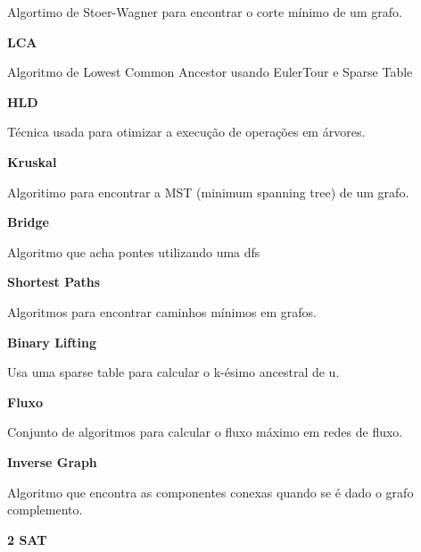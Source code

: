 \documentclass[11pt, a4paper, twoside]{book}
\begin{document}
Algortimo de Stoer-Wagner para encontrar o corte mínimo de um grafo.





\textbf{LCA} 



Algoritmo de Lowest Common Ancestor usando EulerTour e Sparse Table





\textbf{HLD} 



Técnica usada para otimizar a execução de operações em árvores.





\textbf{Kruskal} 



Algoritimo para encontrar a MST (minimum spanning tree) de um grafo.





\textbf{Bridge} 



Algoritmo que acha pontes utilizando uma dfs





\textbf{Shortest Paths} 



Algoritmos para encontrar caminhos mínimos em grafos.





\textbf{Binary Lifting} 



Usa uma sparse table para calcular o k-ésimo ancestral de u.





\textbf{Fluxo} 



Conjunto de algoritmos para calcular o fluxo máximo em redes de fluxo.





\textbf{Inverse Graph} 



Algoritmo que encontra as componentes conexas quando se é dado o grafo complemento.





\textbf{2 SAT} 
\end{document}
